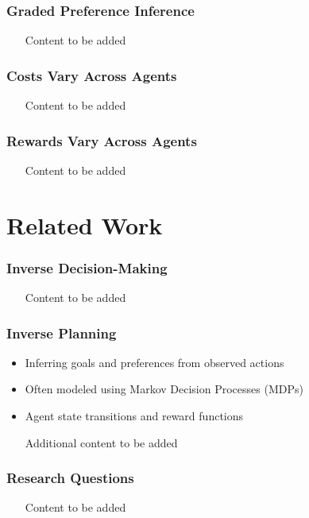 \documentclass{beamer}
\begin{document}
\begin{frame}
\frametitle{Graded Preference Inference}
\begin{itemize}
    \item [Content to be added]
\end{itemize}
\end{frame}

\begin{frame}
\frametitle{Costs Vary Across Agents}
\begin{itemize}
    \item [Content to be added]
\end{itemize}
\end{frame}

\begin{frame}
\frametitle{Rewards Vary Across Agents}
\begin{itemize}
    \item [Content to be added]
\end{itemize}
\end{frame}

\section{Related Work}
\begin{frame}
\frametitle{Inverse Decision-Making}
\begin{itemize}
    \item [Content to be added]
\end{itemize}
\end{frame}

\begin{frame}
\frametitle{Inverse Planning}
\begin{itemize}
    \item Inferring goals and preferences from observed actions
    \item Often modeled using Markov Decision Processes (MDPs)
    \item Agent state transitions and reward functions
    \item [Additional content to be added]
\end{itemize}
\end{frame}

\begin{frame}
\frametitle{Research Questions}
\begin{itemize}
    \item [Content to be added]
\end{itemize}
\end{frame}
\end{document}
